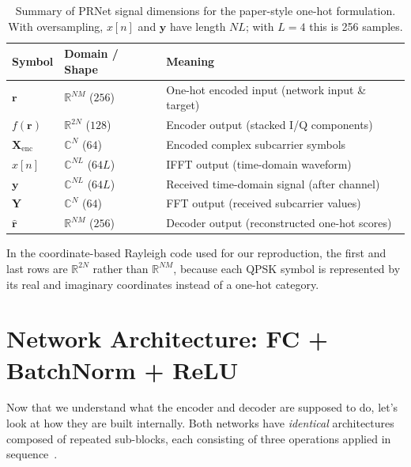 \begin{table}[H]
    \centering
    \caption{Summary of PRNet signal dimensions for the paper-style one-hot
             formulation.  With oversampling, $x[n]$ and $\bm{y}$ have length
             $NL$; with $L=4$ this is 256 samples.}
    \label{tab:prnet_shapes}
    \begin{tabular}{@{} l l l @{}}
        \toprule
        \textbf{Symbol} & \textbf{Domain / Shape} & \textbf{Meaning} \\
        \midrule
        $\bm{r}$              & $\mathbb{R}^{NM}$ ($256$)
            & One-hot encoded input (network input \& target) \\
        $f(\bm{r})$           & $\mathbb{R}^{2N}$ ($128$)
            & Encoder output (stacked I/Q components) \\
        $\bm{X}_{\mathrm{enc}}$ & $\mathbb{C}^{N}$ ($64$)
            & Encoded complex subcarrier symbols \\
        $x[n]$                & $\mathbb{C}^{NL}$ ($64L$)
            & IFFT output (time-domain waveform) \\
        $\bm{y}$              & $\mathbb{C}^{NL}$ ($64L$)
            & Received time-domain signal (after channel) \\
        $\bm{Y}$              & $\mathbb{C}^{N}$ ($64$)
            & FFT output (received subcarrier values) \\
        $\hat{\bm{r}}$        & $\mathbb{R}^{NM}$ ($256$)
            & Decoder output (reconstructed one-hot scores) \\
        \bottomrule
    \end{tabular}
\end{table}

In the coordinate-based Rayleigh code used for our reproduction, the first and
last rows are $\mathbb{R}^{2N}$ rather than $\mathbb{R}^{NM}$, because each
QPSK symbol is represented by its real and imaginary coordinates instead of a
one-hot category.


\section{Network Architecture: FC + BatchNorm + ReLU}
\label{sec:prnet_architecture}

Now that we understand what the encoder and decoder are supposed to do,
let's look at how they are built internally.  Both networks have
\emph{identical} architectures composed of repeated sub-blocks, each
consisting of three operations applied in sequence~\cite{kim2017novel}.


